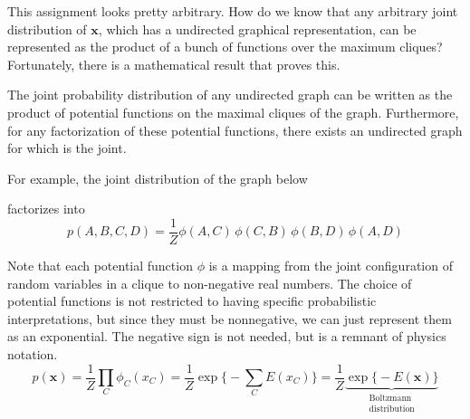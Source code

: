 \documentclass{article}
\begin{document}
  This assignment looks pretty arbitrary. How do we know that any arbitrary joint distribution of $\mathbf{x}$, which has a undirected graphical representation, can be represented as the product of a bunch of functions over the maximum cliques? Fortunately, there is a mathematical result that proves this. 

  \begin{theorem} 
    \label{hammersley}
    The joint probability distribution of any undirected graph can be written as the product of potential functions on the maximal cliques of the graph. Furthermore, for any factorization of these potential functions, there exists an undirected graph for which is the joint.  
  \end{theorem} 


  \begin{example}
    For example, the joint distribution of the graph below
    \begin{figure}[H]
      \centering 
      \caption{} 
      \label{fig:hammersley_clifford_ex}
    \end{figure}
    factorizes into 
    \begin{equation}
      p(A, B, C, D) = \frac{1}{Z} \phi(A, C) \, \phi(C, B) \, \phi(B, D) \, \phi(A, D)
    \end{equation}
  \end{example}

  Note that each potential function $\phi$ is a mapping from the joint configuration of random variables in a clique to non-negative real numbers. The choice of potential functions is not restricted to having specific probabilistic interpretations, but since they must be nonnegative, we can just represent them as an exponential. The negative sign is not needed, but is a remnant of physics notation. 
  \begin{equation}
    p (\mathbf{x}) = \frac{1}{Z} \prod_C \phi_C (x_C) = \frac{1}{Z} \exp \bigg\{ - \sum_C E(x_C) \bigg\} = \frac{1}{Z} \underbrace{\exp \big\{ - E(\mathbf{x}) \big\}}_{\substack{\text{Boltzmann}\\ \text{distribution}}}
  \end{equation}
\end{document}
